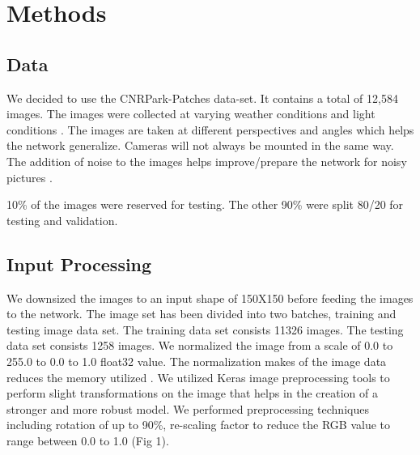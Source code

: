 \documentclass[conference]{IEEEtran}
\begin{document}
\section{Methods}

\subsection{Data}

We decided to use the CNRPark-Patches data-set. It contains a total of 12,584 images. The images were collected at varying weather conditions and light conditions \cite{b3}. The images are taken at different perspectives and angles which helps the network generalize. Cameras will not always be mounted in the same way. The addition of noise to the images helps improve/prepare the network for noisy pictures \cite{b2}.

10\% of the images were reserved for testing. The other 90\% were split 80/20 for testing and validation.


\subsection{Input Processing}
We downsized the images to an input shape of 150X150 before feeding the images to the network. The image set has been divided into two batches, training and testing image data set. The training data set consists 11326 images. The testing data set consists 1258 images. We normalized the image from a scale of 0.0 to 255.0 to 0.0 to 1.0 float32 value. The normalization makes of the image data reduces the memory utilized \cite{b4}. We utilized Keras image preprocessing tools to perform slight transformations on the image that helps in the creation of a stronger and more robust model. We performed preprocessing techniques including rotation of up to 90\%, re-scaling factor to reduce the RGB value to range between 0.0 to 1.0 (Fig 1).
\end{document}

